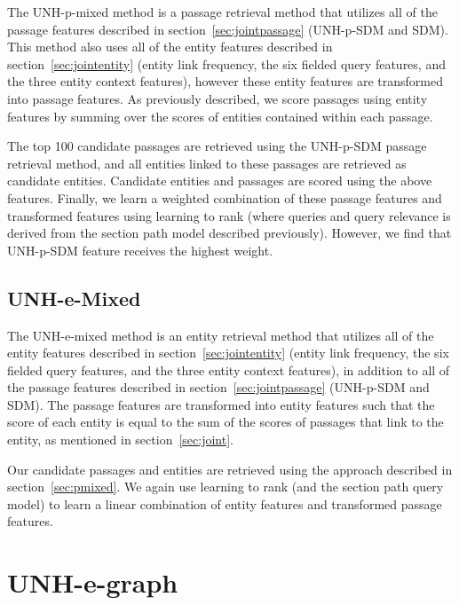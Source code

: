 \documentclass{article}
\begin{document}
The UNH-p-mixed method is a passage retrieval method that utilizes all of the passage features described in section~\ref{sec:jointpassage} (UNH-p-SDM and SDM). This method also uses all of the entity features described in section~\ref{sec:jointentity} (entity link frequency, the six fielded query features, and the three entity context features), however these entity features are transformed into passage features. As previously described, we score passages using entity features by summing over the scores of entities contained within each passage.  

The top 100 candidate passages are retrieved using the UNH-p-SDM passage retrieval method, and all entities linked to these passages are retrieved as candidate entities. Candidate entities and passages are scored using the above features. Finally, we learn a weighted combination of these passage features and transformed features using learning to rank (where queries and query relevance is derived from the section path model described previously). However, we find that UNH-p-SDM feature receives the highest weight.



\subsection{UNH-e-Mixed}\label{sec:emixed}

The UNH-e-mixed method is an entity retrieval method that utilizes all of the entity features described in section~\ref{sec:jointentity} (entity link frequency, the six fielded query features, and the three entity context features), in addition to all of the passage features described in section~\ref{sec:jointpassage} (UNH-p-SDM and SDM). The passage features are transformed into entity features such that the score of each entity is equal to the sum of the scores of passages that link to the entity, as mentioned in section~\ref{sec:joint}.



Our candidate passages and entities are retrieved using the approach described in section~\ref{sec:pmixed}. We again use learning to rank (and the section path query model) to learn a linear combination of entity features and transformed passage features.



\section{UNH-e-graph}
\end{document}
